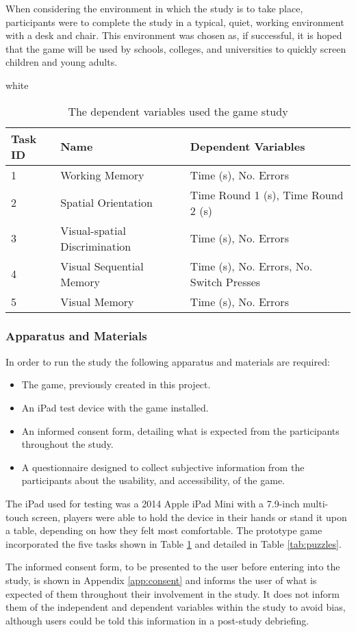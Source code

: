 \documentclass[journal]{IEEEtran}
\newcommand{\tableformat}[4]{
\begin{table}[h]
\centering
  \rowcolors{2}{gray!10} {white}
\begin{tabular}{#1}
  \hline
  \rowcolor[gray]{0.9} #2
\end{tabular}
\caption{#3}
\label{#4}
\end{table}}
\begin{document}
When considering the environment in which the study is to take place, participants were to complete the study in a typical, quiet, working environment with a desk and chair. This environment was chosen as, if successful, it is hoped that the game will be used by schools, colleges, and universities to quickly screen children and young adults.

\tableformat{p{2cm} p{5cm} p{3.6cm}}
{Task ID & Name & Dependent Variables \\ \hline
1 & Working Memory & Time (s), No. Errors \\
2 & Spatial Orientation & Time Round 1 (s), Time Round 2 (s) \\
3 & Visual-spatial Discrimination & Time (s), No. Errors \\
4 & Visual Sequential Memory & Time (s), No. Errors, No. Switch Presses \\
5 & Visual Memory & Time (s), No. Errors \\}
{The dependent variables used the game study}{tab:dependent}

\subsubsection{Apparatus and Materials}
In order to run the study the following apparatus and materials are required:
\begin{itemize}[noitemsep]
\item The game, previously created in this project.
\item An iPad test device with the game installed.
\item An informed consent form, detailing what is expected from the participants throughout the study.
\item A questionnaire designed to collect subjective information from the participants about the usability, and accessibility, of the game.
\end{itemize}
The iPad used for testing was a 2014 Apple iPad Mini with a 7.9-inch multi-touch screen, players were able to hold the device in their hands or stand it upon a table, depending on how they felt most comfortable. The prototype game incorporated the five tasks shown in Table \ref{tab:dependent} and detailed in Table \ref{tab:puzzles}.

The informed consent form, to be presented to the user before entering into the study, is shown in Appendix \ref{app:consent} and informs the user of what is expected of them throughout their involvement in the study. It does not inform them of the independent and dependent variables within the study to avoid bias, although users could be told this information in a post-study debriefing.
\end{document}
